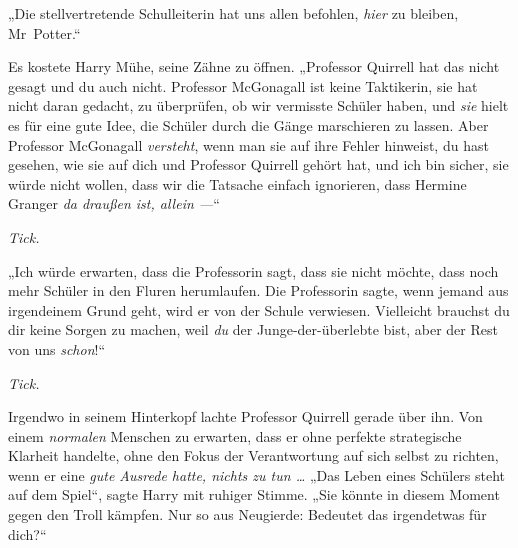 „Die stellvertretende Schulleiterin hat uns allen befohlen, \emph{hier} zu bleiben, Mr~Potter.“

Es kostete Harry Mühe, seine Zähne zu öffnen.
„Professor Quirrell hat das nicht gesagt und du auch nicht. Professor McGonagall ist keine Taktikerin, sie hat nicht daran gedacht, zu überprüfen, ob wir vermisste Schüler haben, und \emph{sie} hielt es für eine gute Idee, die Schüler durch die Gänge marschieren zu lassen. Aber Professor McGonagall \emph{versteht}, wenn man sie auf ihre Fehler hinweist, du hast gesehen, wie sie auf dich und Professor Quirrell gehört hat, und ich bin sicher, sie würde nicht wollen, dass wir die Tatsache einfach ignorieren, dass Hermine Granger \emph{da draußen ist, allein —}“

\emph{Tick.}

„Ich würde erwarten, dass die Professorin sagt, dass sie nicht möchte, dass noch mehr Schüler in den Fluren herumlaufen. Die Professorin sagte, wenn jemand aus irgendeinem Grund geht, wird er von der Schule verwiesen. Vielleicht brauchst du dir keine Sorgen zu machen, weil \emph{du} der Junge-der-überlebte bist, aber der Rest von uns \emph{schon}!“

\emph{Tick.}

Irgendwo in seinem Hinterkopf lachte Professor Quirrell gerade über ihn. Von einem \emph{normalen} Menschen zu erwarten, dass er ohne perfekte strategische Klarheit handelte, ohne den Fokus der Verantwortung auf sich selbst zu richten, wenn er eine \emph{gute Ausrede hatte, nichts zu tun …}
„Das Leben eines Schülers steht auf dem Spiel“, sagte Harry mit ruhiger Stimme.
„Sie könnte in diesem Moment gegen den Troll kämpfen. Nur so aus Neugierde: Bedeutet das irgendetwas für dich?“

